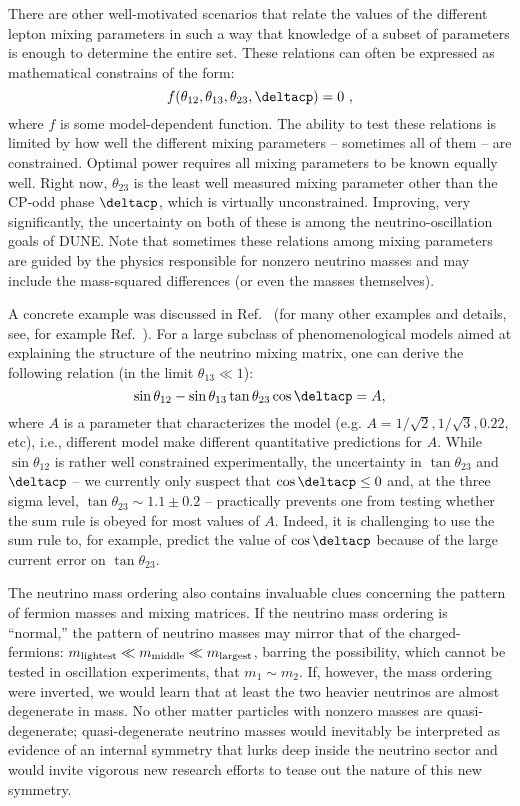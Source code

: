 There are other well-motivated scenarios that relate the values of the different lepton mixing parameters in such a way that knowledge of a subset of parameters is enough to determine the entire set. These relations can often be expressed as mathematical constrains of the form:
\begin{equation}
f(\theta_{12},\theta_{13}, \theta_{23}, \deltacp)=0~,
\end{equation}
where $f$ is some model-dependent function. The ability to test these relations is limited by how well the different mixing parameters -- sometimes all of them -- are constrained. Optimal power requires all mixing parameters to be known equally well. Right now, $\theta_{23}$ is the least well measured mixing parameter other than the CP-odd phase $\deltacp$, which is virtually unconstrained. Improving, very significantly, the uncertainty on both of these is among the neutrino-oscillation goals of DUNE. Note that sometimes these relations among mixing parameters are guided by the physics responsible for nonzero neutrino masses and may include the mass-squared differences (or even the masses themselves).

A concrete example was discussed in Ref.~\cite{Antusch:2007rk} (for many other examples and details, see, for example Ref.~\cite{Ballett:2013wya}). For a large subclass of phenomenological models aimed at explaining the structure of the neutrino mixing matrix, one can derive the following relation (in the limit $\theta_{13}\ll 1$):
$$
\sin\theta_{12}-\sin\theta_{13}\tan\theta_{23}\cos\deltacp = A,
$$
where $A$ is a parameter that characterizes the model (e.g. $A=1/\sqrt{2}, 1/\sqrt{3}, 0.22$, etc), i.e., different model make different quantitative predictions for $A$.  While $\sin\theta_{12}$ is rather well constrained experimentally, the uncertainty in $\tan\theta_{23}$ and $\deltacp$ -- we currently only suspect that $\cos\deltacp\le0$ and, at the three sigma level, $\tan\theta_{23}\sim 1.1\pm0.2$ --  practically prevents one from testing whether the sum rule is obeyed for most values of $A$. Indeed, it is challenging to use the sum rule to, for example, predict the value of $\cos\deltacp$ because of the large current error on $\tan\theta_{23}$. 

The neutrino mass ordering also contains invaluable clues concerning the pattern of fermion masses and mixing matrices. If the neutrino mass ordering is ``normal,'' the pattern of neutrino masses may mirror that of the charged-fermions: $m_{\rm lightest}\ll m_{\rm middle}\ll m_{\rm largest}$, barring the possibility, which cannot be tested in oscillation experiments, that $m_1\sim m_2$. If, however, the mass ordering were inverted, we would learn that at least the two heavier neutrinos are almost degenerate in mass. No other matter particles with nonzero masses are quasi-degenerate; quasi-degenerate neutrino masses would inevitably be interpreted as evidence of an internal symmetry that lurks deep inside the neutrino sector and would invite vigorous new research efforts to tease out the nature of this new symmetry. 

